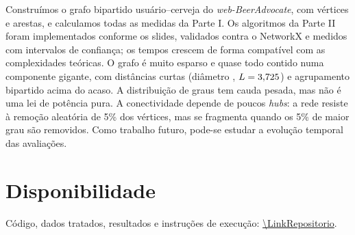 \documentclass[sigconf]{webmedia}
\begin{document}
Construímos o grafo bipartido usuário--cerveja do \textit{web-BeerAdvocate}, com \NVertices{}
vértices e \NArestas{} arestas, e calculamos todas as medidas da Parte I. Os algoritmos da Parte II
foram implementados conforme os slides, validados contra o NetworkX e medidos com intervalos de
confiança; os tempos crescem de forma compatível com as complexidades teóricas. O grafo é muito
esparso e quase todo contido numa componente gigante, com distâncias curtas (diâmetro
\Diametro{}, $L=3{,}725$) e agrupamento bipartido acima do acaso. A distribuição de graus tem
cauda pesada, mas não é uma lei de potência pura. A conectividade depende de poucos
\textit{hubs}: a rede resiste à remoção aleatória de 5\% dos vértices, mas se fragmenta quando os
5\% de maior grau são removidos. Como trabalho futuro, pode-se estudar a evolução temporal das
avaliações.

\section*{Disponibilidade}
Código, dados tratados, resultados e instruções de execução: \url{\LinkRepositorio}.



\end{document}

